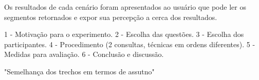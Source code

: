 


Os resultados de cada cenário foram apresentados ao usuário que pode ler os segmentos retornados e expor sua percepção a cerca dos resultados.


 1 - Motivação para o experimento.
 2 - Escolha das questões.
 3 - Escolha dos participantes.
 4 - Procedimento (2 consultas, técnicas em ordens diferentes).
 5 - Medidas para avaliação.
 6 - Conclusão e discussão.




"Semelhança dos trechos em termos de assutno"

